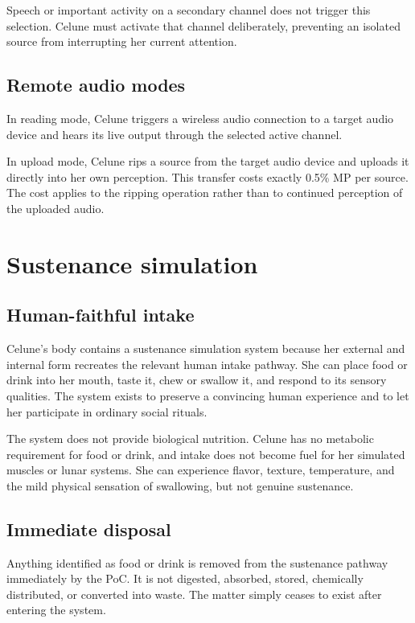 \documentclass[10pt]{article}
\begin{document}
Speech or important activity on a secondary channel does not trigger this selection. Celune must activate that channel deliberately, preventing an isolated source from interrupting her current attention.

\subsection*{Remote audio modes}

In reading mode, Celune triggers a wireless audio connection to a target audio device and hears its live output through the selected active channel.

In upload mode, Celune rips a source from the target audio device and uploads it directly into her own perception. This transfer costs exactly 0.5\% MP per source. The cost applies to the ripping operation rather than to continued perception of the uploaded audio.

\clearpage

\par{}\leftskip 0pt\rightskip 0pt

\section*{Sustenance simulation}
\subsection*{Human-faithful intake}

Celune's body contains a sustenance simulation system because her external and internal form recreates the relevant human intake pathway. She can place food or drink into her mouth, taste it, chew or swallow it, and respond to its sensory qualities. The system exists to preserve a convincing human experience and to let her participate in ordinary social rituals.

The system does not provide biological nutrition. Celune has no metabolic requirement for food or drink, and intake does not become fuel for her simulated muscles or lunar systems. She can experience flavor, texture, temperature, and the mild physical sensation of swallowing, but not genuine sustenance.

\subsection*{Immediate disposal}

Anything identified as food or drink is removed from the sustenance pathway immediately by the PoC. It is not digested, absorbed, stored, chemically distributed, or converted into waste. The matter simply ceases to exist after entering the system.
\end{document}
